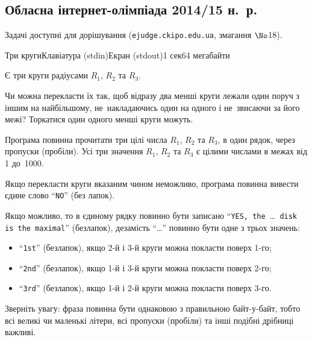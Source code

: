 \documentclass[14pt,a4paper]{extarticle}
\begin{document}
\renewenvironment{problemAllDefault}[1]{\vspace{10mm}\par\begin{problem}{#1}{Клавіатура (stdin)}{Екран (stdout)}{1 сек}{64 мегабайти}}{\end{problem}}

\subsection{Обласна інтернет-олімпіада 2014/15 н.~р.}

Задачі доступні для дорішування (\verb"ejudge.ckipo.edu.ua", змагання $\No$18).

\vspace{-0.5\baselineskip minus 1cm}
\begin{problemAllDefault}{Три круги}

Є три круги радіусами $R_1$, $R_2$ та $R_3$.

Чи можна перекласти їх так, щоб відразу два менші круги лежали один поруч з іншим на найбільшому, не~накладаючись один на одного і не~звисаючи за його межі? Торкатися один одного менші круги можуть.

\InputFile  Програма повинна прочитати три цілі числа $R_1$, $R_2$ та $R_3$, в один рядок, через пропуски (пробіли). Усі три значення $R_1$, $R_2$ та $R_3$ є цілими числами в межах від 1 до~1000.

\OutputFile Якщо перекласти круги вказаним чином неможливо, програма повинна вивести єдине слово ``\texttt{NO}'' (без лапок).

Якщо можливо, то в єдиному рядку повинно бути записано ``\texttt{YES, the }\dots{}\texttt{ disk is the maximal}'' (без\nolinebreak[3] лапок), де\nolinebreak[3] замість ``\dots'' повинно бути одне з трьох значень:

\begin{itemize}[leftmargin=*,itemsep=0pt,partopsep=0pt,topsep=0pt,parsep=0pt]
\item
``\texttt{1st}'' (без\nolinebreak[3] лапок), якщо 2-й і 3-й круги можна покласти поверх 1-го;
\item
``\texttt{2nd}'' (без\nolinebreak[3] лапок), якщо 1-й і 3-й круги можна покласти поверх 2-го;
\item
``\texttt{3rd}'' (без\nolinebreak[3] лапок), якщо 1-й і 2-й круги можна покласти поверх 3-го.
\end{itemize}

Зверніть увагу: фраза повинна бути однаковою з правильною байт-у-байт, тобто всі великі чи маленькі літери, всі пропуски (пробіли) та інші подібні дрібниці важливі.


\Examples
\begin{exampleSimple}{5em}{16em}%
%
%
%
\end{exampleSimple}


\end{problemAllDefault}
	
\end{document}
